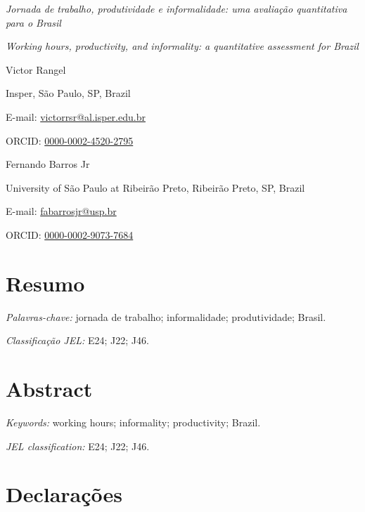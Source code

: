 \documentclass[12pt]{article}
\begin{document}
\begin{center}
{\normalsize\itshape Jornada de trabalho, produtividade e informalidade: uma avalia\c{c}\~ao quantitativa para o Brasil\par}

\vspace{0.8em}
{\normalsize\itshape Working hours, productivity, and informality: a quantitative assessment for Brazil\par}

\vspace{1.5em}
{\normalsize Victor Rangel\par}
Insper, São Paulo, SP, Brazil\par
E-mail: \href{mailto:victorrsr@al.isper.edu.br}{victorrsr@al.isper.edu.br}\par
ORCID: \href{https://orcid.org/0000-0002-4520-2795}{0000-0002-4520-2795}

\vspace{0.8em}
{\normalsize Fernando Barros Jr\par}
University of São Paulo at Ribeirão Preto, Ribeirão Preto, SP, Brazil\par
E-mail: \href{mailto:fabarrosjr@usp.br}{fabarrosjr@usp.br}\par
ORCID: \href{https://orcid.org/0000-0002-9073-7684}{0000-0002-9073-7684}\par
\end{center}

\section*{Resumo}



\textit{Palavras-chave:} jornada de trabalho; informalidade; produtividade; Brasil.

\textit{Classifica\c{c}\~ao JEL:} E24; J22; J46.

\clearpage
{}
\section*{Abstract}



\textit{Keywords:} working hours; informality; productivity; Brazil.

\textit{JEL classification:} E24; J22; J46.

\section*{Declara\c{c}\~oes}
\end{document}
